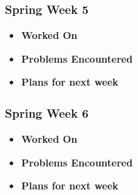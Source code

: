 \documentclass[compsoc,draftclsnofoot,onecolumn,10pt]{IEEEtran}
\begin{document}
\subsubsection{Spring Week 5}
\begin{itemize}
    \item {\textbf{Worked On}}
    \begin{itemize}

    \end{itemize}

    \item {\textbf{Problems Encountered}}
    \begin{itemize}

    \end{itemize}

    \item{\textbf{Plans for next week}}
    \begin{itemize}

    \end{itemize}

\end{itemize}

\subsubsection{Spring Week 6}
\begin{itemize}
    \item {\textbf{Worked On}}
    \begin{itemize}

    \end{itemize}

    \item {\textbf{Problems Encountered}}
    \begin{itemize}

    \end{itemize}

    \item{\textbf{Plans for next week}}
    \begin{itemize}

    \end{itemize}

\end{itemize}
\end{document}
